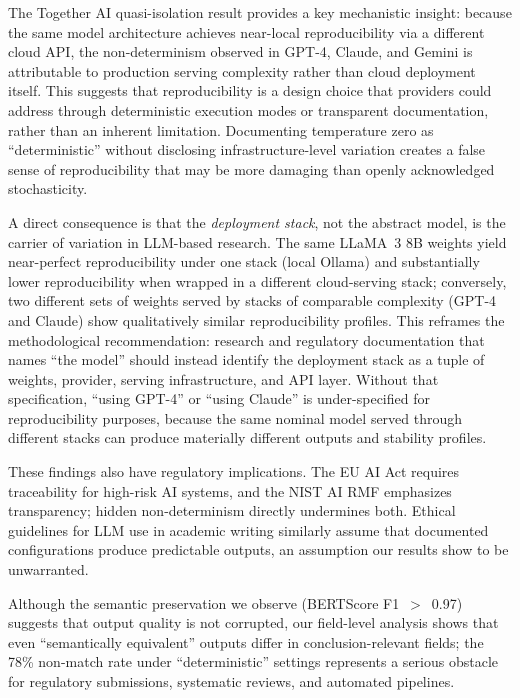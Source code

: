 \documentclass[sn-nature]{sn-jnl}
\begin{document}
The Together AI quasi-isolation result provides a key mechanistic insight: because the same model architecture achieves near-local reproducibility via a different cloud API, the non-determinism observed in GPT-4, Claude, and Gemini is attributable to production serving complexity rather than cloud deployment itself.
This suggests that reproducibility is a design choice that providers could address through deterministic execution modes or transparent documentation, rather than an inherent limitation.
Documenting temperature zero as ``deterministic'' without disclosing infrastructure-level variation creates a false sense of reproducibility that may be more damaging than openly acknowledged stochasticity.

A direct consequence is that the \emph{deployment stack}, not the abstract model, is the carrier of variation in LLM-based research.
The same LLaMA~3 8B weights yield near-perfect reproducibility under one stack (local Ollama) and substantially lower reproducibility when wrapped in a different cloud-serving stack; conversely, two different sets of weights served by stacks of comparable complexity (GPT-4 and Claude) show qualitatively similar reproducibility profiles.
This reframes the methodological recommendation: research and regulatory documentation that names ``the model'' should instead identify the deployment stack as a tuple of weights, provider, serving infrastructure, and API layer.
Without that specification, ``using GPT-4'' or ``using Claude'' is under-specified for reproducibility purposes, because the same nominal model served through different stacks can produce materially different outputs and stability profiles.

These findings also have regulatory implications.
The EU AI Act\cite{euaiact2024} requires traceability for high-risk AI systems, and the NIST AI RMF\cite{nist2023ai} emphasizes transparency; hidden non-determinism directly undermines both.
Ethical guidelines for LLM use in academic writing\cite{porsdam2024ethics} similarly assume that documented configurations produce predictable outputs, an assumption our results show to be unwarranted.

Although the semantic preservation we observe (BERTScore F1~$>$~0.97) suggests that output quality is not corrupted, our field-level analysis shows that even ``semantically equivalent'' outputs differ in conclusion-relevant fields; the 78\% non-match rate under ``deterministic'' settings represents a serious obstacle for regulatory submissions, systematic reviews, and automated pipelines.
\end{document}
